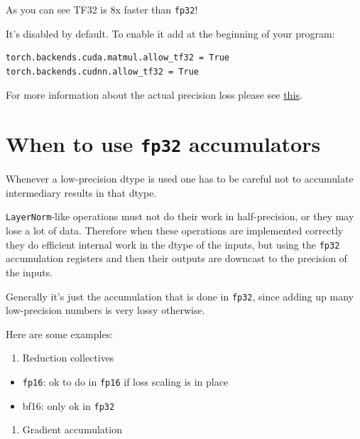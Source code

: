 \documentclass[
]{report}
\providecommand{\tightlist}{%
  \setlength{\itemsep}{0pt}\setlength{\parskip}{0pt}}\usepackage{longtable,booktabs,array}
\begin{document}
As you can see TF32 is 8x faster than \texttt{fp32}!

It's disabled by default. To enable it add at the beginning of your
program:

\begin{verbatim}
torch.backends.cuda.matmul.allow_tf32 = True
torch.backends.cudnn.allow_tf32 = True
\end{verbatim}

For more information about the actual precision loss please see
\href{https://pytorch.org/docs/stable/notes/cuda.html\#tensorfloat-32-tf32-on-ampere-and-later-devices}{this}.

\section{\texorpdfstring{When to use \texttt{fp32}
accumulators}{When to use fp32 accumulators}}\label{when-to-use-fp32-accumulators}

Whenever a low-precision dtype is used one has to be careful not to
accumulate intermediary results in that dtype.

\texttt{LayerNorm}-like operations must not do their work in
half-precision, or they may lose a lot of data. Therefore when these
operations are implemented correctly they do efficient internal work in
the dtype of the inputs, but using the \texttt{fp32} accumulation
registers and then their outputs are downcast to the precision of the
inputs.

Generally it's just the accumulation that is done in \texttt{fp32},
since adding up many low-precision numbers is very lossy otherwise.

Here are some examples:

\begin{enumerate}
\def\labelenumi{\arabic{enumi}.}
\tightlist
\item
  Reduction collectives
\end{enumerate}

\begin{itemize}
\item
  \texttt{fp16}: ok to do in \texttt{fp16} if loss scaling is in place
\item
  bf16: only ok in \texttt{fp32}
\end{itemize}

\begin{enumerate}
\def\labelenumi{\arabic{enumi}.}
\setcounter{enumi}{1}
\tightlist
\item
  Gradient accumulation
\end{enumerate}
\end{document}
